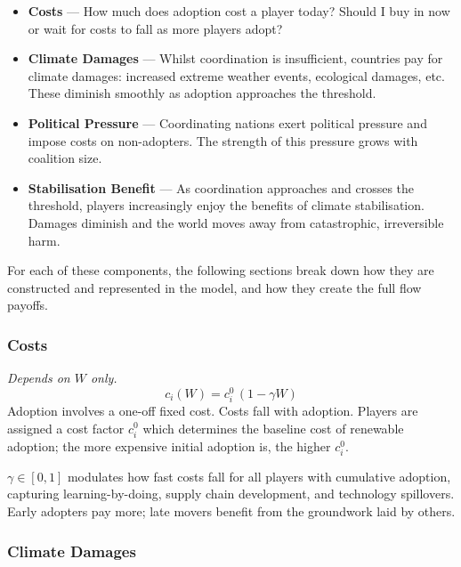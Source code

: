 \documentclass[12pt,a4paper]{article}
\begin{document}
\begin{itemize}
  \item \textbf{Costs} --- How much does adoption cost a player today? Should I buy in now or wait for costs to fall as more players adopt?
  \item \textbf{Climate Damages} --- Whilst coordination is insufficient, countries pay for climate damages: increased extreme weather events, ecological damages, etc. These diminish smoothly as adoption approaches the threshold.
  \item \textbf{Political Pressure} --- Coordinating nations exert political pressure and impose costs on non-adopters. The strength of this pressure grows with coalition size.
  \item \textbf{Stabilisation Benefit} --- As coordination approaches and crosses the threshold, players increasingly enjoy the benefits of climate stabilisation. Damages diminish and the world moves away from catastrophic, irreversible harm.
\end{itemize}

For each of these components, the following sections break down how they are constructed and represented in the model, and how they create the full flow payoffs.

\subsubsection{Costs}

\textit{Depends on $W$ only.}
\[
  c_i(W) = c_i^0\,(1 - \gamma W)
\]
Adoption involves a one-off fixed cost. Costs fall with adoption. Players are assigned a cost factor $c_i^0$ which determines the baseline cost of renewable adoption; the more expensive initial adoption is, the higher $c_i^0$.

$\gamma \in [0,1]$ modulates how fast costs fall for all players with cumulative adoption, capturing learning-by-doing, supply chain development, and technology spillovers. Early adopters pay more; late movers benefit from the groundwork laid by others.

\subsubsection{Climate Damages}
\end{document}
